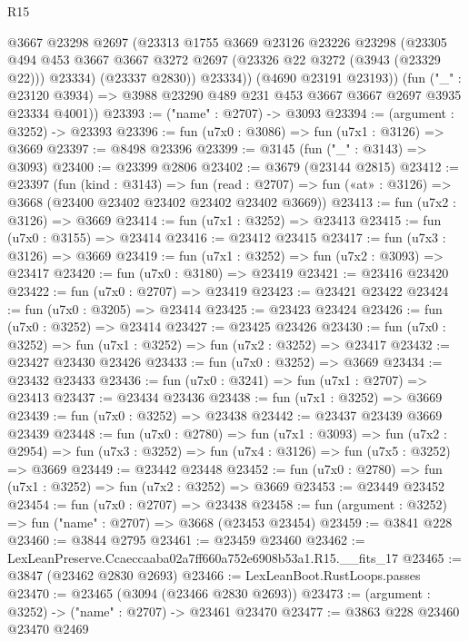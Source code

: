 \begin{lexlean}{R15}
\begin{coremodule}
            @3667
            @23298
            @2697
            (@23313
              @1755
              @3669
              @23126
              @23226
              @23298
              (@23305
                @494
                @453
                @3667
                @3667
                @3272
                @2697
                (@23326 @22 @3272 (@3943 (@23329 @22)))
                @23334)
              (@23337 @2830))
            @23334))
        (@4690 @23191 @23193))
      (fun ("_" : @23120 @3934) =>
      @3988 @23290 @489 @231 @453 @3667 @3667 @2697 @3935 @23334 @4001))
@23393 := ("name" : @2707) -> @3093
@23394 := (argument : @3252) -> @23393
@23396 := fun (u7x0 : @3086) => fun (u7x1 : @3126) => @3669
@23397 := @8498 @23396
@23399 := @3145 (fun ("_" : @3143) => @3093)
@23400 := @23399 @2806
@23402 := @3679 (@23144 @2815)
@23412 := @23397
    (fun (kind : @3143) =>
    fun (read : @2707) => fun («at» : @3126) => @3668 (@23400 @23402 @23402 @23402 @23402 @3669))
@23413 := fun (u7x2 : @3126) => @3669
@23414 := fun (u7x1 : @3252) => @23413
@23415 := fun (u7x0 : @3155) => @23414
@23416 := @23412 @23415
@23417 := fun (u7x3 : @3126) => @3669
@23419 := fun (u7x1 : @3252) => fun (u7x2 : @3093) => @23417
@23420 := fun (u7x0 : @3180) => @23419
@23421 := @23416 @23420
@23422 := fun (u7x0 : @2707) => @23419
@23423 := @23421 @23422
@23424 := fun (u7x0 : @3205) => @23414
@23425 := @23423 @23424
@23426 := fun (u7x0 : @3252) => @23414
@23427 := @23425 @23426
@23430 := fun (u7x0 : @3252) => fun (u7x1 : @3252) => fun (u7x2 : @3252) => @23417
@23432 := @23427 @23430 @23426
@23433 := fun (u7x0 : @3252) => @3669
@23434 := @23432 @23433
@23436 := fun (u7x0 : @3241) => fun (u7x1 : @2707) => @23413
@23437 := @23434 @23436
@23438 := fun (u7x1 : @3252) => @3669
@23439 := fun (u7x0 : @3252) => @23438
@23442 := @23437 @23439 @3669 @23439
@23448 := fun (u7x0 : @2780) =>
  fun (u7x1 : @3093) =>
  fun (u7x2 : @2954) => fun (u7x3 : @3252) => fun (u7x4 : @3126) => fun (u7x5 : @3252) => @3669
@23449 := @23442 @23448
@23452 := fun (u7x0 : @2780) => fun (u7x1 : @3252) => fun (u7x2 : @3252) => @3669
@23453 := @23449 @23452
@23454 := fun (u7x0 : @2707) => @23438
@23458 := fun (argument : @3252) => fun ("name" : @2707) => @3668 (@23453 @23454)
@23459 := @3841 @228
@23460 := @3844 @2795
@23461 := @23459 @23460
@23462 := LexLeanPreserve.Ccaeccaaba02a7ff660a752e6908b53a1.R15.__fits_17
@23465 := @3847 (@23462 @2830 @2693)
@23466 := LexLeanBoot.RustLoops.passes
@23470 := @23465 (@3094 (@23466 @2830 @2693))
@23473 := (argument : @3252) -> ("name" : @2707) -> @23461 @23470
@23477 := @3863 @228 @23460 @23470 @2469

\end{coremodule}
\end{lexlean}
